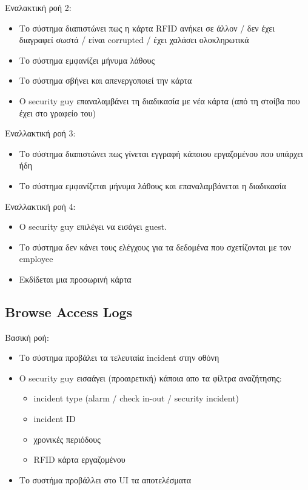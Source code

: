 \documentclass{article}
\begin{document}
\noindent Εναλακτική ροή 2:
\begin{itemize}
    \item Το σύστημα διαπιστώνει πως η κάρτα RFID ανήκει σε άλλον / δεν έχει διαγραφεί σωστά / είναι corrupted / έχει χαλάσει ολοκληρωτικά
    \item Το σύστημα εμφανίζει μήνυμα λάθους
    \item Το σύστημα σβήνει και απενεργοποιεί την κάρτα
    \item Ο security guy επαναλαμβάνει τη διαδικασία με νέα κάρτα (από τη στοίβα που έχει στο γραφείο του)
\end{itemize}

\noindent Εναλλακτική ροή 3:
\begin{itemize}
    \item Το σύστημα διαπιστώνει πως γίνεται εγγραφή κάποιου εργαζομένου που υπάρχει ήδη
    \item Το σύστημα εμφανίζεται μήνυμα λάθους και επαναλαμβάνεται η διαδικασία
\end{itemize}

\noindent Εναλλακτική ροή 4:
\begin{itemize}
    \item Ο security guy επιλέγει να εισάγει guest.
    \item Το σύστημα δεν κάνει τους ελέγχους για τα δεδομένα που σχετίζονται με τον employee
    \item Εκδίδεται μια προσωρινή κάρτα
\end{itemize}


\subsection{Browse Access Logs}

\noindent Βασική ροή:
\begin{itemize}
    \item Το σύστημα προβάλει τα τελευταία incident στην οθόνη
    \item O security guy εισαάγει (προαιρετική) κάποια απο τα φίλτρα αναζήτησης:
    \begin{itemize}
        \item incident type (alarm / check in-out / security incident)
        \item incident ID
        \item χρονικές περιόδους
        \item RFID κάρτα εργαζομένου
    \end{itemize}
    \item Το συστήμα προβάλλει στο UI τα αποτελέσματα
\end{itemize}
\end{document}
